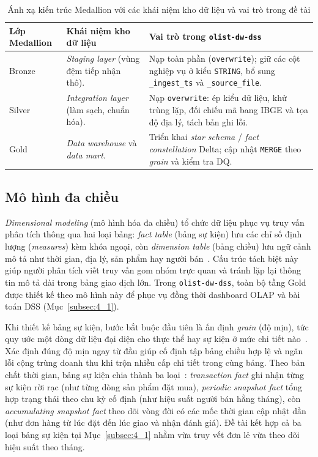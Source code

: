 \documentclass[a4paper]{article}
\begin{document}
\begin{table}[htbp]
\centering
\caption{Ánh xạ kiến trúc Medallion với các khái niệm kho dữ liệu và vai trò trong đề tài}
\label{tab:medallion_mapping}
\begin{tabularx}{\textwidth}{l>{\raggedright\arraybackslash}X>{\raggedright\arraybackslash}X}
\toprule
\textbf{Lớp Medallion} & \textbf{Khái niệm kho dữ liệu} & \textbf{Vai trò trong \texttt{olist-dw-dss}} \\
\midrule
Bronze & \textit{Staging layer} (vùng đệm tiếp nhận thô). & Nạp toàn phần (\texttt{overwrite}); giữ các cột nghiệp vụ ở kiểu \texttt{STRING}, bổ sung \texttt{\_ingest\_ts} và \texttt{\_source\_file}. \\
Silver & \textit{Integration layer} (làm sạch, chuẩn hóa). & Nạp \texttt{overwrite}: ép kiểu dữ liệu, khử trùng lặp, đối chiếu mã bang IBGE và tọa độ địa lý, tách bản ghi lỗi. \\
Gold & \textit{Data warehouse} và \textit{data mart}. & Triển khai \textit{star schema} / \textit{fact constellation} Delta; cập nhật \texttt{MERGE} theo \textit{grain} và kiểm tra DQ. \\
\bottomrule
\end{tabularx}
\end{table}

\subsection{Mô hình đa chiều}
\label{subsec:2_2}

\textit{Dimensional modeling} (mô hình hóa đa chiều) tổ chức dữ liệu phục vụ truy vấn phân tích thông qua hai loại bảng: \textit{fact table} (bảng sự kiện) lưu các chỉ số định lượng (\textit{measures}) kèm khóa ngoại, còn \textit{dimension table} (bảng chiều) lưu ngữ cảnh mô tả như thời gian, địa lý, sản phẩm hay người bán~\cite{bib:kimball2013,bib:golfarelli1998}. Cấu trúc tách biệt này giúp người phân tích viết truy vấn gom nhóm trực quan và tránh lặp lại thông tin mô tả dài trong bảng giao dịch lớn. Trong \texttt{olist-dw-dss}, toàn bộ tầng Gold được thiết kế theo mô hình này để phục vụ đồng thời dashboard OLAP và bài toán DSS (Mục~\ref{subsec:4_1}).

Khi thiết kế bảng sự kiện, bước bắt buộc đầu tiên là ấn định \textit{grain} (độ mịn), tức quy ước một dòng dữ liệu đại diện cho thực thể hay sự kiện ở mức chi tiết nào~\cite{bib:kimball2013}. Xác định đúng độ mịn ngay từ đầu giúp cố định tập bảng chiều hợp lệ và ngăn lỗi cộng trùng doanh thu khi trộn nhiều cấp chi tiết trong cùng bảng. Theo bản chất thời gian, bảng sự kiện chia thành ba loại~\cite{bib:kimball2013}: \textit{transaction fact} ghi nhận từng sự kiện rời rạc (như từng dòng sản phẩm đặt mua), \textit{periodic snapshot fact} tổng hợp trạng thái theo chu kỳ cố định (như hiệu suất người bán hằng tháng), còn \textit{accumulating snapshot fact} theo dõi vòng đời có các mốc thời gian cập nhật dần (như đơn hàng từ lúc đặt đến lúc giao và nhận đánh giá). Đề tài kết hợp cả ba loại bảng sự kiện tại Mục~\ref{subsec:4_1} nhằm vừa truy vết đơn lẻ vừa theo dõi hiệu suất theo tháng.
\end{document}

